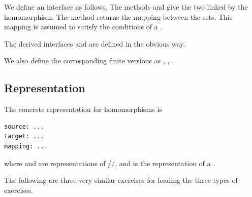 
We define an interface  as follows.
The methods  and  give the two  linked by the homomorphism.
The method  returns the mapping between the sets.
This mapping is assumed to satisfy the conditions of a .


The derived interfaces  and  are defined in the obvious way.


We also define the corresponding finite versions as , , .

\subsection{Representation}


The concrete representation for homomorphisms is
%
\begin{verbatim}
source: ...
target: ...
mapping: ...
\end{verbatim}
%
where  and  are representations of //, and  is the representation of a .

The following are three very similar exercises for loading the three types of exercises.


\begin{widepar}
\end{widepar}


\begin{widepar}
\end{widepar}

